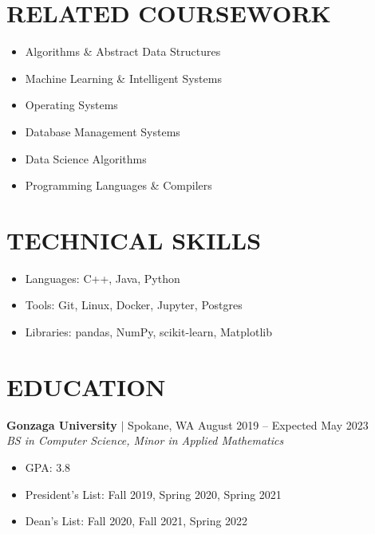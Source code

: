 \documentclass[11pt, a4paper, roman]{moderncv}
\newcommand{\education}[5]{
	\textbf{#1} $|$ #2
	\hfill#3
	\\\textit{#4}
	#5
	\vspace{2mm}
}
\begin{document}
\maketitle
\vspace*{-12mm}

\begin{multicols}{2}

\section{RELATED COURSEWORK}
{\begin{itemize}
    \item Algorithms \& Abstract Data Structures
    \item Machine Learning \& Intelligent Systems
    \item Operating Systems
    \item Database Management Systems
    \item Data Science Algorithms
    \item Programming Languages \& Compilers
  \end{itemize}
} 

\columnbreak  


\section{TECHNICAL SKILLS}
{\begin{itemize}
    \item Languages: C++, Java, Python
    \item Tools: Git, Linux, Docker, Jupyter, Postgres
    \item Libraries: pandas, NumPy, scikit-learn, Matplotlib
  \end{itemize}
}
\end{multicols}
\vspace*{-2mm}
\section{EDUCATION}

\education{Gonzaga University}{Spokane, WA}{August 2019 -- Expected May 2023}{BS in Computer Science, Minor in Applied Mathematics}
	{\begin{itemize}
    		\item GPA: 3.8
    		\item President's List: Fall 2019, Spring 2020, Spring 2021
    		\item Dean's List: Fall 2020, Fall 2021, Spring 2022
  	\end{itemize}
}
\end{document}

